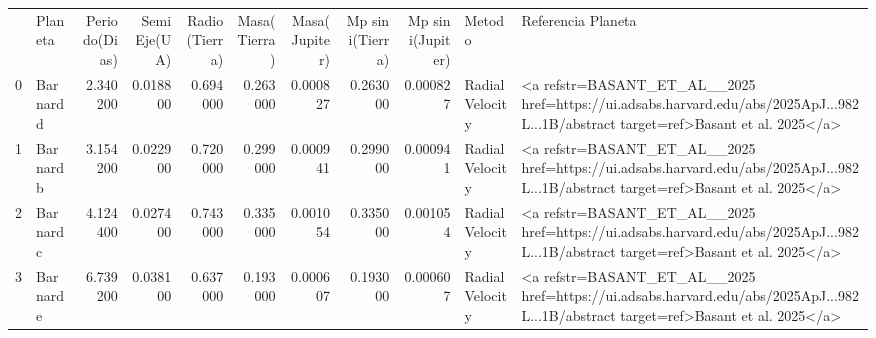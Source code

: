 \begin{tabular}{llrrrrrrrll}
 & Planeta & Periodo(Dias) & Semi Eje(UA) & Radio(Tierra) & Masa(Tierra) & Masa(Jupiter) & Mp sin i(Tierra) & Mp sin i(Jupiter) & Metodo & Referencia Planeta \\
0 & Barnard d & 2.340200 & 0.018800 & 0.694000 & 0.263000 & 0.000827 & 0.263000 & 0.000827 & Radial Velocity & <a refstr=BASANT_ET_AL__2025 href=https://ui.adsabs.harvard.edu/abs/2025ApJ...982L...1B/abstract target=ref>Basant et al. 2025</a> \\
1 & Barnard b & 3.154200 & 0.022900 & 0.720000 & 0.299000 & 0.000941 & 0.299000 & 0.000941 & Radial Velocity & <a refstr=BASANT_ET_AL__2025 href=https://ui.adsabs.harvard.edu/abs/2025ApJ...982L...1B/abstract target=ref>Basant et al. 2025</a> \\
2 & Barnard c & 4.124400 & 0.027400 & 0.743000 & 0.335000 & 0.001054 & 0.335000 & 0.001054 & Radial Velocity & <a refstr=BASANT_ET_AL__2025 href=https://ui.adsabs.harvard.edu/abs/2025ApJ...982L...1B/abstract target=ref>Basant et al. 2025</a> \\
3 & Barnard e & 6.739200 & 0.038100 & 0.637000 & 0.193000 & 0.000607 & 0.193000 & 0.000607 & Radial Velocity & <a refstr=BASANT_ET_AL__2025 href=https://ui.adsabs.harvard.edu/abs/2025ApJ...982L...1B/abstract target=ref>Basant et al. 2025</a> \\
\end{tabular}
